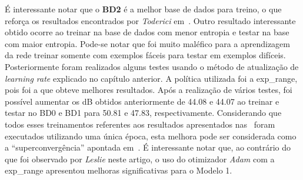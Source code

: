 É interessante notar que o \textbf{BD2} é a melhor base de dados para treino, o que reforça os resultados encontrados por \textit{Toderici} em~\cite{toderici2017full}. Outro resultado interessante obtido ocorre ao treinar na base de dados com menor entropia e testar na base com maior entropia. Pode-se notar que foi muito maléfico para a aprendizagem da rede treinar somente com exemplos fáceis para testar em exemplos difíceis. Posteriormente foram realizados alguns testes usando o método de atualização de \textit{learning rate} explicado no capítulo anterior. A política utilizada foi a exp\_range, pois foi a que obteve melhores resultados. Após a realização de vários testes, foi possível aumentar os \acrshort{dB} obtidos anteriormente de 44.08 e 44.07 ao treinar e testar no BD0 e BD1 para 50.81 e 47.83, respectivamente. Considerando que todos esses treinamentos referentes aos resultados apresentados nas~ foram executados utilizando uma única época, esta melhora pode ser considerada como a ``superconvergência'' apontada em~\cite{smith2017cyclical}. É interessante notar que, ao contrário do que foi observado por \textit{Leslie} neste artigo, o uso do otimizador \textit{Adam} com a exp\_range apresentou melhoras significativas para o Modelo 1.
